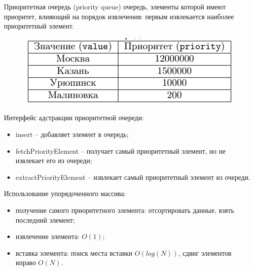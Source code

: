 \documentclass{beamer}
\begin{document}
\begin{frame}[t]
	\begin{block}{Приоритетная очередь (priority queue)}
		очередь, элементы которой имеют приоритет, влияющий на порядок извлечения: первым извлекается наиболее приоритетный элемент.
	\end{block}
	\begin{figure}[h]
		\centering
		\includegraphics[scale=0.5]{images/lec06-pic02.png}
	\end{figure}	
	Интерфейс адстракции приоритетной очереди:
	\begin{itemize}
		\item insert -- добавляет элемент в очередь;
		\item fetchPriorityElement -- получает самый приоритетный элемент, но не извлекает его из очереди;
		\item extractPriorityElement -- извлекает самый приоритетный элемент из очереди.
	\end{itemize}
\end{frame}

\begin{frame}
	Использование упорядоченного массива:
	\begin{itemize}
		\item получение самого приоритетного элемента: отсортировать данные, взять последний элемент;
		\item извлечение элемента: $O(1)$;
		\item вставка элемента: поиск места вставки $O(log(N))$, сдвиг элементов вправо $O(N)$.
	\end{itemize}
\end{frame}
\end{document}
